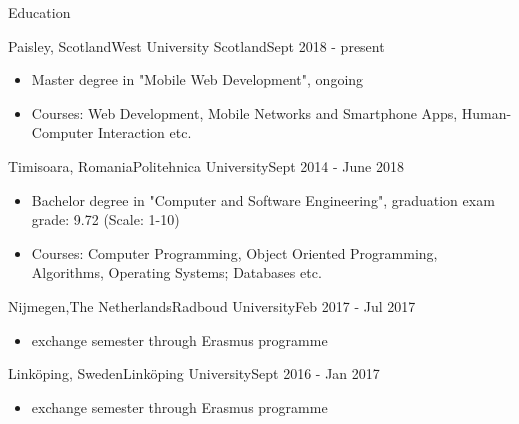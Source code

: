 \documentclass[]{mcdowellcv}
\begin{document}
	\begin{cvsection}{Education}
		\begin{cvsubsection}{Paisley, Scotland}{West University Scotland}{Sept 2018 - present}
			\begin{itemize}
				\item Master degree in "Mobile Web Development", ongoing
				\item Courses: Web Development, Mobile Networks and Smartphone Apps, Human-Computer Interaction etc.
			\end{itemize}
		\end{cvsubsection}

		\begin{cvsubsection}{Timisoara, Romania}{Politehnica University}{Sept 2014 - June 2018}
			\begin{itemize}
				\item Bachelor degree in "Computer and Software Engineering", graduation exam grade: 9.72 (Scale: 1-10)
				\item Courses: Computer Programming, Object Oriented Programming, Algorithms, Operating Systems; Databases etc.
			\end{itemize}
		\end{cvsubsection}
	
		\begin{cvsubsection}{Nijmegen,The Netherlands}{Radboud University}{Feb 2017 - Jul 2017}
			\begin{itemize}
				\item exchange semester through Erasmus programme 
			\end{itemize}
		\end{cvsubsection}

		\begin{cvsubsection}{Linköping, Sweden}{Linköping University}{Sept 2016 - Jan 2017}
			\begin{itemize}
				\item exchange semester through Erasmus programme 
			\end{itemize}
		\end{cvsubsection}

	\end{cvsection}
	
\end{document}
